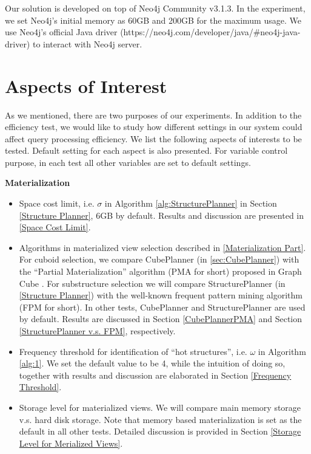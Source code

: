 Our solution is developed on top of Neo4j Community v3.1.3. In the experiment, we set Neo4j's initial memory as 60GB and 200GB for the maximum usage. We use Neo4j's official Java driver (https://neo4j.com/developer/java/#neo4j-java-driver) to interact with Neo4j server.

\section{Aspects of Interest}
\label{Aspects of Interest}

As we mentioned, there are two purposes of our experiments. In addition to the efficiency test, we would like to study how different settings in our system could affect query processing efficiency. We list the following aspects of interests to be tested. Default setting for each aspect is also presented. For variable control purpose, in each test all other variables are set to default settings.

\textbf{Materialization}
\begin{itemize}
	
	\item  Space cost limit, i.e. $\sigma$ in Algorithm \ref{alg:StructurePlanner} in Section \ref{Structure Planner}, 6GB by default. Results and discussion are presented in \ref{Space Cost Limit}.
	
	\item  Algorithms in materialized view selection described in \ref{Materialization Part}. For cuboid selection, we compare CubePlanner (in \ref{sec:CubePlanner}) with the ``Partial Materialization'' algorithm (PMA for short) proposed in Graph Cube \cite{DBLP:conf/sigmod/ZhaoLXH11}. For substructure selection we will compare StructurePlanner (in \ref{Structure Planner}) with the well-known frequent pattern mining algorithm (FPM for short). In other tests, CubePlanner and StructurePlanner are used by default. Results are discussed in Section \ref{CubePlannerPMA} and Section \ref{StructurePlanner v.s. FPM}, respectively.
	
	\item Frequency threshold for identification of “hot structures”, i.e. $\omega$ in Algorithm \ref{alg:1}. We set the default value to be 4, while the intuition of doing so, together with results and discussion are elaborated in Section \ref{Frequency Threshold}.
	
	\item Storage level for materialized views. We will compare main memory storage v.s. hard disk storage. Note that memory based materialization is set as the default in all other tests. Detailed discussion is provided in Section \ref{Storage Level for Merialized Views}.
	
\end{itemize}

